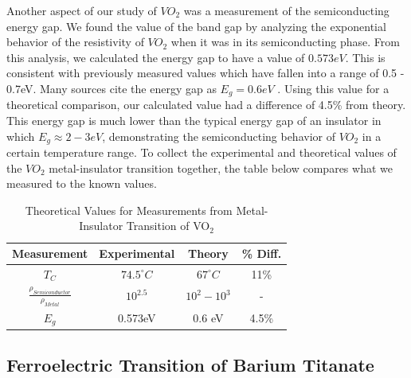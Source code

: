 \documentclass[%
 reprint,
 amsmath,amssymb,
 aps,
 pra,
]{revtex4-1}
\begin{document}
Another aspect of our study of $VO_{2}$ was a measurement of the semiconducting energy gap. We found the value of the band gap by analyzing the exponential behavior of the resistivity of $VO_{2}$ when it was in its semiconducting phase. From this analysis, we calculated the energy gap to have a value of $0.573 eV$. This is consistent with previously measured values which have fallen into a range of 0.5 - 0.7eV. Many sources cite the energy gap as $E_g = 0.6eV$ \cite{VO2BandTheory}. Using this value for a theoretical comparison, our calculated value had a difference of 4.5\% from theory. This energy gap is much lower than the typical energy gap of an insulator in which $E_g \approx 2 - 3 eV$, demonstrating the semiconducting behavior of $VO_{2}$ in a certain temperature range. To collect the experimental and theoretical values of the $VO_{2}$ metal-insulator transition together, the table below compares what we measured to the known values.

\begin{table}[htbp]
	\begin{center}
		\begin{tabular}{|c|c|c|c|}
			\hline \textbf{Measurement} & \textbf{Experimental} & \textbf{Theory} & \% \textbf{Diff.} \\
			\hline $T_{C}$ & $74.5^{\circ} C$ & $67^{\circ} C$ & 11\%\\
			\hline $\frac{\rho_{Semiconductor}}{\rho_{Metal}}$ & $10^{2.5}$ & $10^{2} - 10^{3}$ & - \\
			\hline $E_{g}$ & 0.573eV & 0.6 eV & 4.5\%\\
			\hline
		\end{tabular}
	\end{center}
	\caption{Theoretical Values for Measurements from Metal-Insulator Transition of VO$_{2}$}
	\label{Tab:VO2Compare}
\end{table}

\subsection{Ferroelectric Transition of Barium Titanate}
\end{document}
